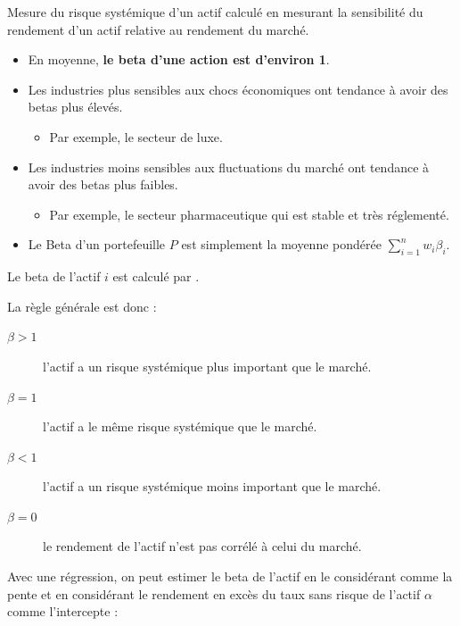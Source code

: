 \documentclass[10pt, french]{article}
\begin{document}
\begin{multicols*}{2}
\begin{definitionNOHFILLsub}
\end{definitionNOHFILLsub}

\begin{definitionNOHFILLsub}
Mesure du risque systémique d'un actif calculé en mesurant la sensibilité du rendement d'un actif relative au rendement du marché.
\begin{itemize}
	\item	En moyenne, \textbf{le beta d'une action est d'environ 1}.
	\item	Les industries plus sensibles aux chocs économiques ont tendance à avoir des betas plus élevés.
		\begin{itemize}
		\item	 Par exemple, le secteur de luxe.
		\end{itemize}
	\item	Les industries moins sensibles aux fluctuations du marché ont tendance à avoir des betas plus faibles.
		\begin{itemize}
		\item	Par exemple, le secteur pharmaceutique qui est stable et très réglementé.
		\end{itemize}
	\item	Le Beta d'un portefeuille $P$ est simplement la moyenne pondérée $\sum_{i = 1}^{n} w_{i} \beta_{i}$.
\end{itemize}

\tcbline

Le beta de l'actif $i$ est calculé par .

La règle générale est donc :
\begin{description}
	\item[$\beta > 1$]	l'actif a un risque systémique plus important que le marché.
	\item[$\beta = 1$]	l'actif a le même risque systémique que le marché.
	\item[$\beta < 1$]	l'actif a un risque systémique moins important que le marché.
	\item[$\beta = 0$]	le rendement de l'actif n'est pas corrélé à celui du marché.
\end{description}
\end{definitionNOHFILLsub}

Avec une régression, on peut estimer le beta de l'actif en le considérant comme la pente et en considérant le rendement en excès du taux sans risque de l'actif $\alpha$ comme l'intercepte :
\begin{center}


\end{center}
\end{multicols*}
\end{document}
